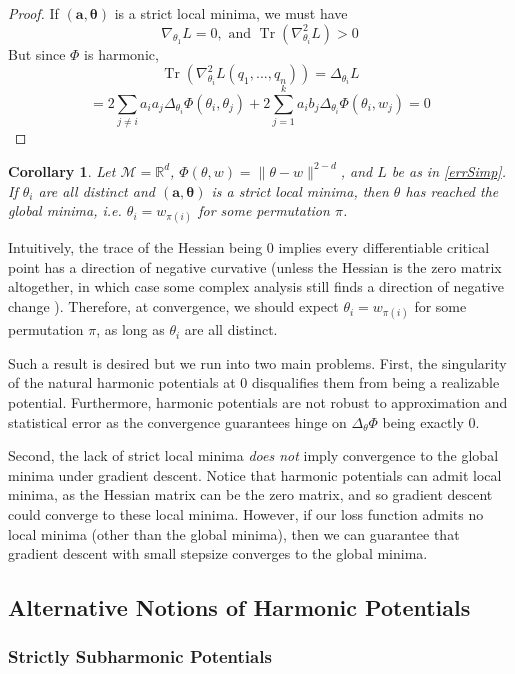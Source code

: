 \documentclass{article}
\newtheorem{corollary}[theorem]{Corollary}
\newcommand{\R}{{\mathbb{R}}}
\DeclareMathOperator{\Tr}{Tr}
\begin{document}
\begin{proof}
If $(\boldsymbol{a,\theta})$ is a strict local minima, we must have
\[\nabla_{\theta_1} L = 0, \text{ and }  \Tr(\nabla^2_{\theta_i}L) > 0\]
But since $\Phi$ is harmonic,
\[ \Tr(\nabla^2_{\theta_i}L(q_1,...,q_n)) = \Delta_{\theta_i} L\]
\[ =  2\sum_{ j\neq i} a_ia_j \Delta_{\theta_i}\Phi(\theta_i,\theta_j) + 2\sum_{j=1}^ka_ib_j  \Delta_{\theta_i}\Phi(\theta_i,w_j) = 0\]
\end{proof}

\begin{corollary}
Let $\mathcal{M} = \R^d$, $\Phi(\theta,w) = \|\theta-w\|^{2-d}$, and $L$ be as in \eqref{errSimp}. If $\theta_i$ are all distinct and $(\boldsymbol{a,\theta})$ is a strict local minima, then $\theta$ has reached the global minima, i.e. $\theta_i = w_{\pi(i)}$ for some permutation $\pi$. 
\end{corollary}
\fi

Intuitively, the trace of the Hessian being 0 implies every differentiable critical point has a direction of negative curvative (unless the Hessian is the zero matrix altogether, in which case some complex analysis still finds a direction of negative change \cite{arnold1985mathematical}). Therefore, at convergence, we should expect $\theta_i = w_{\pi(i)}$ for some permutation $\pi$, as long as $\theta_i$ are all distinct. 

Such a result is desired but we run into two main problems. First, the singularity of the natural harmonic potentials at $0$ disqualifies them from being a realizable potential. Furthermore, harmonic potentials are not robust to approximation and statistical error as the convergence guarantees hinge on $\Delta_\theta\Phi$ being exactly 0. 

Second, the lack of strict local minima {\it does not} imply
convergence to the global minima under gradient descent. Notice that
harmonic potentials can admit local minima, as the Hessian matrix can
be the zero matrix, and so gradient descent could converge to these
local minima. However, if our loss function admits no local minima
(other than the global minima), then we can guarantee that gradient
descent with small stepsize converges to the global minima.

\subsection{Alternative Notions of Harmonic Potentials}

\subsubsection{Strictly Subharmonic Potentials}
\end{document}
